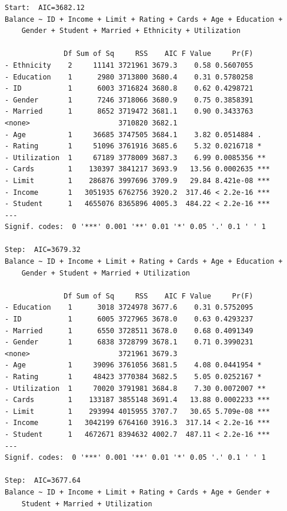 \documentclass[
]{article}
\begin{document}
\begin{verbatim}
Start:  AIC=3682.12
Balance ~ ID + Income + Limit + Rating + Cards + Age + Education + 
    Gender + Student + Married + Ethnicity + Utilization

              Df Sum of Sq     RSS    AIC F Value     Pr(F)    
- Ethnicity    2     11141 3721961 3679.3    0.58 0.5607055    
- Education    1      2980 3713800 3680.4    0.31 0.5780258    
- ID           1      6003 3716824 3680.8    0.62 0.4298721    
- Gender       1      7246 3718066 3680.9    0.75 0.3858391    
- Married      1      8652 3719472 3681.1    0.90 0.3433763    
<none>                     3710820 3682.1                      
- Age          1     36685 3747505 3684.1    3.82 0.0514884 .  
- Rating       1     51096 3761916 3685.6    5.32 0.0216718 *  
- Utilization  1     67189 3778009 3687.3    6.99 0.0085356 ** 
- Cards        1    130397 3841217 3693.9   13.56 0.0002635 ***
- Limit        1    286876 3997696 3709.9   29.84 8.421e-08 ***
- Income       1   3051935 6762756 3920.2  317.46 < 2.2e-16 ***
- Student      1   4655076 8365896 4005.3  484.22 < 2.2e-16 ***
---
Signif. codes:  0 '***' 0.001 '**' 0.01 '*' 0.05 '.' 0.1 ' ' 1

Step:  AIC=3679.32
Balance ~ ID + Income + Limit + Rating + Cards + Age + Education + 
    Gender + Student + Married + Utilization

              Df Sum of Sq     RSS    AIC F Value     Pr(F)    
- Education    1      3018 3724978 3677.6    0.31 0.5752095    
- ID           1      6005 3727965 3678.0    0.63 0.4293237    
- Married      1      6550 3728511 3678.0    0.68 0.4091349    
- Gender       1      6838 3728799 3678.1    0.71 0.3990231    
<none>                     3721961 3679.3                      
- Age          1     39096 3761056 3681.5    4.08 0.0441954 *  
- Rating       1     48423 3770384 3682.5    5.05 0.0252167 *  
- Utilization  1     70020 3791981 3684.8    7.30 0.0072007 ** 
- Cards        1    133187 3855148 3691.4   13.88 0.0002233 ***
- Limit        1    293994 4015955 3707.7   30.65 5.709e-08 ***
- Income       1   3042199 6764160 3916.3  317.14 < 2.2e-16 ***
- Student      1   4672671 8394632 4002.7  487.11 < 2.2e-16 ***
---
Signif. codes:  0 '***' 0.001 '**' 0.01 '*' 0.05 '.' 0.1 ' ' 1

Step:  AIC=3677.64
Balance ~ ID + Income + Limit + Rating + Cards + Age + Gender + 
    Student + Married + Utilization


\end{verbatim}
\end{document}
